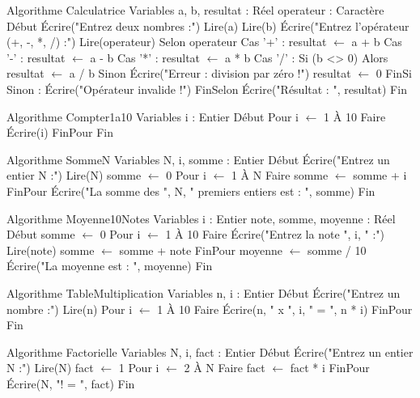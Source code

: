 \begin{algo}
Algorithme Calculatrice
Variables
    a, b, resultat : Réel
    operateur : Caractère
Début
    Écrire("Entrez deux nombres :")
    Lire(a)
    Lire(b)
    Écrire("Entrez l'opérateur (+, -, *, /) :")
    Lire(operateur)
    Selon operateur
        Cas '+' : resultat $\leftarrow$ a + b
        Cas '-' : resultat $\leftarrow$ a - b
        Cas '*' : resultat $\leftarrow$ a * b
        Cas '/' : 
            Si (b <> 0) Alors
                resultat $\leftarrow$ a / b
            Sinon
                Écrire("Erreur : division par zéro !")
                resultat $\leftarrow$ 0
            FinSi
        Sinon : Écrire("Opérateur invalide !")
    FinSelon
    Écrire("Résultat : ", resultat)
Fin
\end{algo}

\begin{algo}
Algorithme Compter1a10
Variables
    i : Entier
Début
    Pour i $\leftarrow$ 1 À 10 Faire
        Écrire(i)
    FinPour
Fin
\end{algo}

\begin{algo}
Algorithme SommeN
Variables
    N, i, somme : Entier
Début
    Écrire("Entrez un entier N :")
    Lire(N)
    somme $\leftarrow$ 0
    Pour i $\leftarrow$ 1 À N Faire
        somme $\leftarrow$ somme + i
    FinPour
    Écrire("La somme des ", N, " premiers entiers est : ", somme)
Fin
\end{algo}

\begin{algo}
Algorithme Moyenne10Notes
Variables
    i : Entier
    note, somme, moyenne : Réel
Début
    somme $\leftarrow$ 0
    Pour i $\leftarrow$ 1 À 10 Faire
        Écrire("Entrez la note ", i, " :")
        Lire(note)
        somme $\leftarrow$ somme + note
    FinPour
    moyenne $\leftarrow$ somme / 10
    Écrire("La moyenne est : ", moyenne)
Fin
\end{algo}

\begin{algo}
Algorithme TableMultiplication
Variables
    n, i : Entier
Début
    Écrire("Entrez un nombre :")
    Lire(n)
    Pour i $\leftarrow$ 1 À 10 Faire
        Écrire(n, " x ", i, " = ", n * i)
    FinPour
Fin
\end{algo}

\begin{algo}
Algorithme Factorielle
Variables
    N, i, fact : Entier
Début
    Écrire("Entrez un entier N :")
    Lire(N)
    fact $\leftarrow$ 1
    Pour i $\leftarrow$ 2 À N Faire
        fact $\leftarrow$ fact * i
    FinPour
    Écrire(N, "! = ", fact)
Fin
\end{algo}

